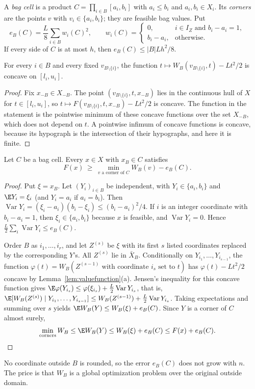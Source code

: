 A \emph{bag cell} is a product $C=\prod_{i\in B}[a_i,b_i]$ with
$a_i\le b_i$ and $a_i,b_i\in X_i$. Its \emph{corners} are the points $v$
with $v_i\in\{a_i,b_i\}$; they are feasible bag values. Put
\[
e_B(C)=\frac L8\sum_{i\in B}w_i(C)^2,\qquad
w_i(C)=\begin{cases}
0,& i\in I_Z\text{ and }b_i-a_i=1,\\
b_i-a_i,&\text{otherwise.}
\end{cases}
\]
If every side of $C$ is at most $h$, then $e_B(C)\le|B|Lh^2/8$.

\begin{lemma}\label{lem:cr-semiconcave}
For every $i\in B$ and every fixed $v_{B\setminus\{i\}}$, the function
$t\mapsto W_B(v_{B\setminus\{i\}},t)-Lt^2/2$ is concave on $[l_i,u_i]$.
\end{lemma}
\begin{proof}
Fix $x_{-B}\in X_{-B}$. The point $(v_{B\setminus\{i\}},t,x_{-B})$ lies in
the continuous hull of $X$ for $t\in[l_i,u_i]$, so
$t\mapsto F(v_{B\setminus\{i\}},t,x_{-B})-Lt^2/2$ is concave. The
function in the statement is the pointwise minimum of these concave
functions over the set $X_{-B}$, which does not depend on $t$. A pointwise
infimum of concave functions is concave, because its hypograph is the
intersection of their hypographs, and here it is finite.
\end{proof}

\begin{lemma}\label{lem:cr-cell}
Let $C$ be a bag cell. Every $x\in X$ with $x_B\in C$ satisfies
\[
F(x)\ \ge\ \min_{v\text{ a corner of }C}W_B(v)-e_B(C).
\]
\end{lemma}
\begin{proof}
Put $\xi=x_B$. Let $(Y_i)_{i\in B}$ be independent, with $Y_i\in\{a_i,b_i\}$
and $\E Y_i=\xi_i$ (and $Y_i=a_i$ if $a_i=b_i$). Then
$\operatorname{Var}Y_i=(\xi_i-a_i)(b_i-\xi_i)\le(b_i-a_i)^2/4$. If $i$ is an
integer coordinate with $b_i-a_i=1$, then $\xi_i\in\{a_i,b_i\}$ because
$x$ is feasible, and $\operatorname{Var}Y_i=0$. Hence
$\frac L2\sum_i\operatorname{Var}Y_i\le e_B(C)$.

Order $B$ as $i_1,\ldots,i_r$, and let $Z^{(s)}$ be $\xi$ with its first $s$
listed coordinates replaced by the corresponding $Y$'s. All $Z^{(s)}$ lie
in $\bar X_B$. Conditionally on $Y_{i_1},\ldots,Y_{i_{s-1}}$, the
function $\varphi(t)=W_B(Z^{(s-1)}\text{ with coordinate }i_s\text{ set to }t)$
has $\varphi(t)-Lt^2/2$ concave by Lemma~\ref{lem:valuefunction}(a). Jensen's
inequality for this concave function gives
$\E\varphi(Y_{i_s})\le\varphi(\xi_{i_s})+\frac L2\operatorname{Var}Y_{i_s}$,
that is,
$\E[W_B(Z^{(s)})\mid Y_{i_1},\ldots,Y_{i_{s-1}}]
\le W_B(Z^{(s-1)})+\frac L2\operatorname{Var}Y_{i_s}$.
Taking expectations and summing over $s$ yields
$\E W_B(Y)\le W_B(\xi)+e_B(C)$. Since $Y$ is a corner of $C$ almost surely,
\[
\min_{\text{corners}}W_B\le\E W_B(Y)\le W_B(\xi)+e_B(C)\le F(x)+e_B(C).
\qedhere
\]
\end{proof}

No coordinate outside $B$ is rounded, so the error $e_B(C)$ does not grow
with $n$. The price is that $W_B$ is a global optimization problem over
the original outside domain.

